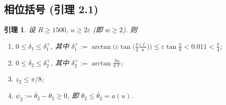 \documentclass[UTF8]{ctexart}
\newtheorem{lemma}[theorem]{引理}
\begin{document}
\subsection{相位括号 (引理 2.1)}
\begin{lemma}\label{lem:phases}
设 $R\ge 1500$, $u\ge 2\varepsilon$ (即 $w\ge 2$). 则
\begin{enumerate}
	\item[(a)] $0\le\delta_1\le\delta_1^+$, 其中
		$\delta_1^+:=\arctan\bigl(\varepsilon\tan\bigl(\frac\pi2\frac{\varepsilon\ell}{u}\bigr)\bigr)
		\le\varepsilon\tan\frac\pi8<0.011<\frac\pi4$;
	\item[(b)] $0\le\delta_2\le\delta_2^+$, 其中 $\delta_2^+:=\arctan\frac{2u}{\pi\ell}$;
	\item[(c)] $z_2\le\pi/8$;
	\item[(d)] $\psi_2:=\bar\theta_2-\theta_2\ge 0$, 即 $\theta_2\le\bar\theta_2=a(u)$.
\end{enumerate}
\end{lemma}
\end{document}
